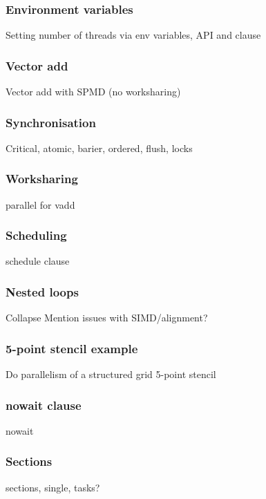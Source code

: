 \documentclass{beamer}
\begin{document}
\begin{frame}
\frametitle{Environment variables}
Setting number of threads via env variables, API and clause
\end{frame}

\begin{frame}
\frametitle{Vector add}
Vector add with SPMD (no worksharing)
\end{frame}

\begin{frame}
\frametitle{Synchronisation}
Critical, atomic, barier, ordered, flush, locks
\end{frame}

\begin{frame}
\frametitle{Worksharing}
parallel for vadd

\end{frame}

\begin{frame}
\frametitle{Scheduling}
schedule clause

\end{frame}

\begin{frame}
\frametitle{Nested loops}
Collapse
Mention issues with SIMD/alignment?

\end{frame}

\begin{frame}
\frametitle{5-point stencil example}
Do parallelism of a structured grid 5-point stencil
\end{frame}

\begin{frame}
\frametitle{nowait clause}
nowait
\end{frame}

\begin{frame}
\frametitle{Sections}
sections, single, tasks?
\end{frame}
\end{document}
